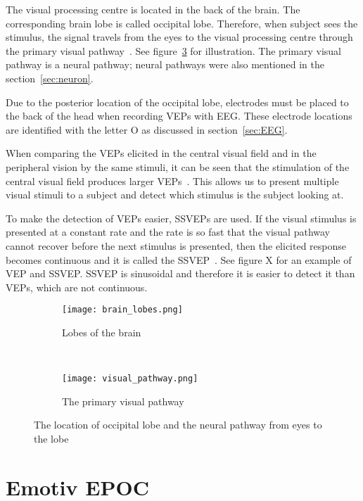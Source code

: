 The visual processing centre is located in the back of the brain. The corresponding brain lobe is called occipital lobe. Therefore, when subject sees the stimulus, the signal travels from the eyes to the visual processing centre through the primary visual pathway~\cite{neuroscience}. See figure~\ref{fig:lobes_pathway} for illustration. The primary visual pathway is a neural pathway; neural pathways were also mentioned in the section~\ref{sec:neuron}.

Due to the posterior location of the occipital lobe, electrodes must be placed to the back of the head when recording \glspl{VEP} with \gls{EEG}. These electrode locations are identified with the letter O as discussed in section~\ref{sec:EEG}.

When comparing the \glspl{VEP} elicited in the central visual field and in the peripheral vision by the same stimuli, it can be seen that the stimulation of the central visual field produces larger \glspl{VEP}~\cite{VEP_size}. This allows us to present multiple visual stimuli to a subject and detect which stimulus is the subject looking at. 

To make the detection of \glspl{VEP} easier, \glspl{SSVEP} are used. If the visual stimulus is presented at a constant rate and the rate is so fast that the visual pathway cannot recover before the next stimulus is presented, then the elicited response becomes continuous and it is called the \gls{SSVEP}~\cite{VEP}. See figure X for an example of \gls{VEP} and \gls{SSVEP}. \gls{SSVEP} is sinusoidal and therefore it is easier to detect it than \glspl{VEP}, which are not continuous.

\begin{figure}[h]
	\centering
	\begin{subfigure}{0.48\textwidth}
		\texttt{[image: brain\_lobes.png]}
		\caption{Lobes of the brain~\cite{blausen}}
		\label{fig:brain_lobes}
	\end{subfigure}
	~
	\begin{subfigure}{0.48\textwidth}
		\texttt{[image: visual\_pathway.png]}
		\caption{The primary visual pathway~\cite[p.~261]{neuroscience}}
		\label{fig:visual_pathway}
	\end{subfigure}
	\caption{The location of occipital lobe and the neural pathway from eyes to the lobe}
	\label{fig:lobes_pathway}
\end{figure}

\section{Emotiv EPOC}
\label{sec:EEG_comparison}

